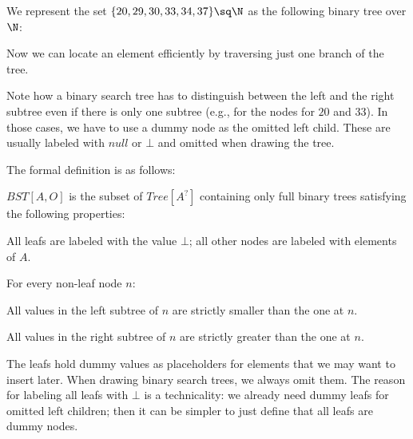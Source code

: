 \begin{example}
We represent the set $\{20,29,30,33,34,37\}\sq \N$ as the following binary tree over $\N$:

\begin{center}
\end{center}
Now we can locate an element efficiently by traversing just one branch of the tree.

Note how a binary search tree has to distinguish between the left and the right subtree even if there is only one subtree (e.g., for the nodes for $20$ and $33$).
In those cases, we have to use a dummy node as the omitted left child.
These are usually labeled with $null$ or $\bot$ and omitted when drawing the tree.
\end{example}

The formal definition is as follows:

\begin{definition}
$BST[A,O]$ is the subset of $Tree[A^?]$ containing only full binary trees satisfying the following properties:
\begin{compactitem}
 \item All leafs are labeled with the value $\bot$; all other nodes are labeled with elements of $A$.
 \item For every non-leaf node $n$:
  \begin{compactitem}
    \item All values in the left subtree of $n$ are strictly smaller than the one at $n$.
    \item All values in the right subtree of $n$ are strictly greater than the one at $n$.
  \end{compactitem}
\end{compactitem}
\end{definition}

The leafs hold dummy values as placeholders for elements that we may want to insert later.
When drawing binary search trees, we always omit them.
The reason for labeling all leafs with $\bot$ is a technicality: we already need dummy leafs for omitted left children; then it can be simpler to just define that all leafs are dummy nodes.

